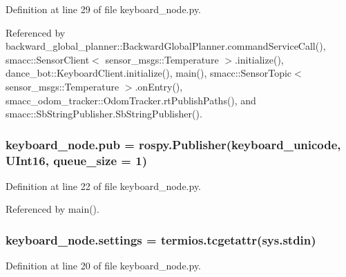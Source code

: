 Definition at line 29 of file keyboard\+\_\+node.\+py.



Referenced by backward\+\_\+global\+\_\+planner\+::\+Backward\+Global\+Planner.\+command\+Service\+Call(), smacc\+::\+Sensor\+Client$<$ sensor\+\_\+msgs\+::\+Temperature $>$.\+initialize(), dance\+\_\+bot\+::\+Keyboard\+Client.\+initialize(), main(), smacc\+::\+Sensor\+Topic$<$ sensor\+\_\+msgs\+::\+Temperature $>$.\+on\+Entry(), smacc\+\_\+odom\+\_\+tracker\+::\+Odom\+Tracker.\+rt\+Publish\+Paths(), and smacc\+::\+Sb\+String\+Publisher.\+Sb\+String\+Publisher().

\subsubsection[{\texorpdfstring{pub}{pub}}]{\setlength{\rightskip}{0pt plus 5cm}keyboard\+\_\+node.\+pub = rospy.\+Publisher(\textquotesingle{}keyboard\+\_\+unicode\textquotesingle{}, U\+Int16, queue\+\_\+size = 1)}\hypertarget{namespacekeyboard__node_af6db75302d320b64f2d03f7b84404a9f}{}\label{namespacekeyboard__node_af6db75302d320b64f2d03f7b84404a9f}


Definition at line 22 of file keyboard\+\_\+node.\+py.



Referenced by main().

\subsubsection[{\texorpdfstring{settings}{settings}}]{\setlength{\rightskip}{0pt plus 5cm}keyboard\+\_\+node.\+settings = termios.\+tcgetattr(sys.\+stdin)}\hypertarget{namespacekeyboard__node_aaf29d185963f7dbed690d072de1a0b17}{}\label{namespacekeyboard__node_aaf29d185963f7dbed690d072de1a0b17}


Definition at line 20 of file keyboard\+\_\+node.\+py.

